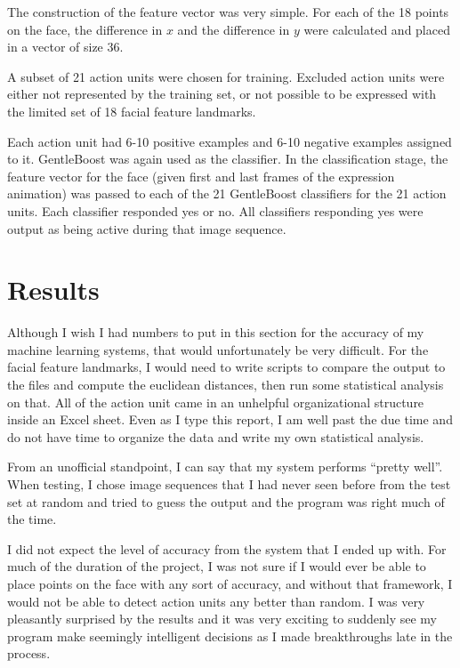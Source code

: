 \documentclass[13pt,letterpaper]{scrartcl}
\begin{document}
	The construction of the feature vector was very simple. For each of the 18 points on the face, the difference in $x$ and the difference in $y$ were calculated and placed in a vector of size 36.
	
	A subset of 21 action units were chosen for training. Excluded action units were either not represented by the training set, or not possible to be expressed with the limited set of 18 facial feature landmarks.
	
	Each action unit had 6-10 positive examples and 6-10 negative examples assigned to it. GentleBoost was again used as the classifier. In the classification stage, the feature vector for the face (given first and last frames of the expression animation) was passed to each of the 21 GentleBoost classifiers for the 21 action units. Each classifier responded yes or no. All classifiers responding yes were output as being active during that image sequence.
	
	\section{Results}
	Although I wish I had numbers to put in this section for the accuracy of my machine learning systems, that would unfortunately be very difficult. For the facial feature landmarks, I would need to write scripts to compare the output to the files and compute the euclidean distances, then run some statistical analysis on that. All of the action unit came in an unhelpful organizational structure inside an Excel sheet. Even as I type this report, I am well past the due time and do not have time to organize the data and write my own statistical analysis.
	
	From an unofficial standpoint, I can say that my system performs ``pretty well''. When testing, I chose image sequences that I had never seen before from the test set at random	 and tried to guess the output and the program was right much of the time.
	
	I did not expect the level of accuracy from the system that I ended up with. For much of the duration of the project, I was not sure if I would ever be able to place points on the face with any sort of accuracy, and without that framework, I would not be able to detect action units any better than random. I was very pleasantly surprised by the results and it was very exciting to suddenly see my program make seemingly intelligent decisions as I made breakthroughs late in the process.
	
\end{document}
